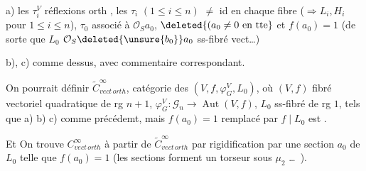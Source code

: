 a) les $\tau_i^V$ réflexions orth , les $\tau_i$ $(1\leq i\leq n)$  $\ne$ id en chaque fibre ($\Rightarrow L_i,H_i$ pour $1\leq i\leq n$), $\tau_0$ associé à $\mathcal O_S a_0$, $\deleted{(a_0\ne0\text{ en tte}}$ et $\boxed{f(a_0)=1}$ (de sorte que $L_0$ $\mathcal O_S\deleted{\unsure{b_0}}a_0$ ss-fibré vect\ldots)

b), c) comme dessus, avec commentaire correspondant.

On pourrait définir $\widetilde C^\infty_{vect\,orth}$, catégorie des  $(V,f,\varphi_G^V,L_0)$, où   $(V,f)$ fibré vectoriel quadratique  de rg $n+1$, $\varphi_G^V:\mathscr G_n\longrightarrow\operatorname{Aut}(V,f)$, $L_0$ ss-fibré de rg $1$, tels que a) b) c) comme précédemt, mais $f(a_0)=1$ remplacé par $f\mid L_0$ est \uline{}.

Et On trouve $C^\infty_{vect\,orth}$ à partir de $\widetilde C^\infty_{vect\,orth}$ par rigidification par une section $a_0$ de $L_0$ telle que $f(a_0)=1$ (les sections forment un torseur sous $\mu_2$ \ldots\ ).



